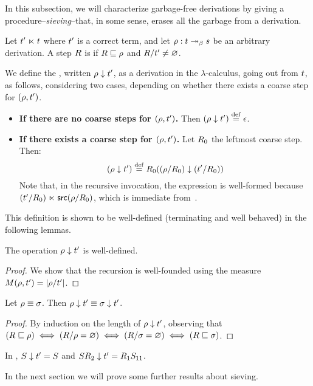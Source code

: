 
In this subsection, we will characterize garbage-free derivations by giving
a procedure--\emph{sieving}--that, in some sense, erases all the garbage from a derivation.

\begin{definition}[Sieving]
Let $t' \mathrel{\ltimes} t$ where $t'$ is a correct term,
and let $\rho : t \mathrel{\twoheadrightarrow_\beta} s$ be an arbitrary derivation.
A step $R$ is  if
$R \sqsubseteq \rho$ and $R/t' \neq \varnothing$.

We define the ,
written $\rho \downarrow t'$, as a derivation in the $\lambda$-calculus,
going out from $t$, as follows, considering two cases, depending on whether there exists a
coarse step for $(\rho,t')$.
\begin{itemize}
\item {\bf If there are no coarse steps for $(\rho,t')$.}
  Then
  $(\rho \downarrow t') \overset{\mathrm{def}}{=} \epsilon$.
\item {\bf If there exists a coarse step for $(\rho,t')$.}
  Let $R_0$ the leftmost coarse step.
  Then:
  \[
    (\rho \downarrow t') \overset{\mathrm{def}}{=} R_0 ((\rho/R_0) \downarrow (t'/R_0))
  \]
  Note that, in the recursive invocation, the expression is well-formed because
  $(t'/R_0) \mathrel{\ltimes} \mathsf{src}(\rho/R_0)$,
  which is immediate from~.
\end{itemize}
This definition is shown to be well-defined (terminating and well behaved) in the following lemmas.
\end{definition}

\begin{lemma}
The operation $\rho \downarrow t'$ is well-defined.
\end{lemma}
\begin{proof}
We show that the recursion is well-founded using the measure
  $M(\rho,t') = |\rho/t'|$.
\end{proof}

\begin{lemma}
Let $\rho \equiv \sigma$. Then $\rho \downarrow t' \equiv \sigma \downarrow t'$.
\end{lemma}
\begin{proof}
By induction on the length of $\rho \downarrow t'$, observing that
$(R \sqsubseteq \rho) \iff (R/\rho = \varnothing) \iff (R/\sigma = \varnothing) \iff (R \sqsubseteq \sigma)$.
\end{proof}

\begin{example}
In ,
$S \downarrow t' = S$
and
$SR_2 \downarrow t' = R_1S_{11}$.
\end{example}

In the next section we will prove some further results about sieving.
